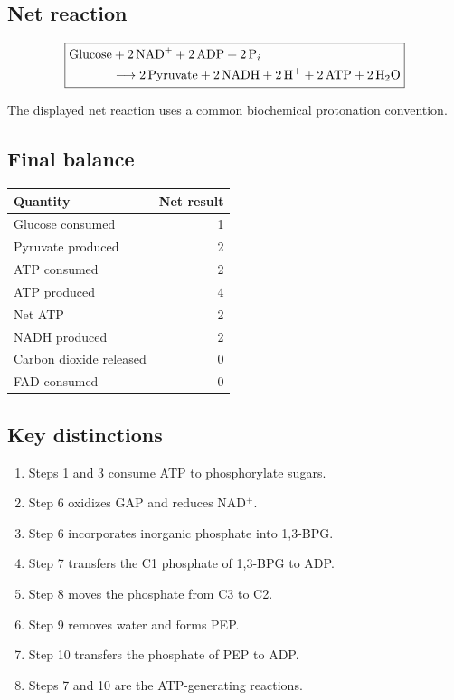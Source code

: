 \documentclass[10pt,a4paper,landscape]{article}
\begin{document}
\normalsize

\subsection*{Net reaction}

\[
\boxed{
\begin{aligned}
\ce{Glucose}
&+\ce{2 NAD+}
+\ce{2 ADP}
+\ce{2 P_i}
\\
&\longrightarrow
\ce{2 Pyruvate}
+\ce{2 NADH}
+\ce{2 H+}
+\ce{2 ATP}
+\ce{2 H2O}
\end{aligned}
}
\]

The displayed net reaction uses a common biochemical protonation
convention.

\subsection*{Final balance}

\begin{center}
\begin{tabular}{lr}
\toprule
\textbf{Quantity} & \textbf{Net result}\\
\midrule
Glucose consumed & 1\\
Pyruvate produced & 2\\
ATP consumed & 2\\
ATP produced & 4\\
Net ATP & 2\\
NADH produced & 2\\
Carbon dioxide released & 0\\
FAD consumed & 0\\
\bottomrule
\end{tabular}
\end{center}

\subsection*{Key distinctions}

\begin{enumerate}
  \item Steps 1 and 3 consume ATP to phosphorylate sugars.
  \item Step 6 oxidizes GAP and reduces NAD$^+$.
  \item Step 6 incorporates inorganic phosphate into 1,3-BPG.
  \item Step 7 transfers the C1 phosphate of 1,3-BPG to ADP.
  \item Step 8 moves the phosphate from C3 to C2.
  \item Step 9 removes water and forms PEP.
  \item Step 10 transfers the phosphate of PEP to ADP.
  \item Steps 7 and 10 are the ATP-generating reactions.
\end{enumerate}
\end{document}
